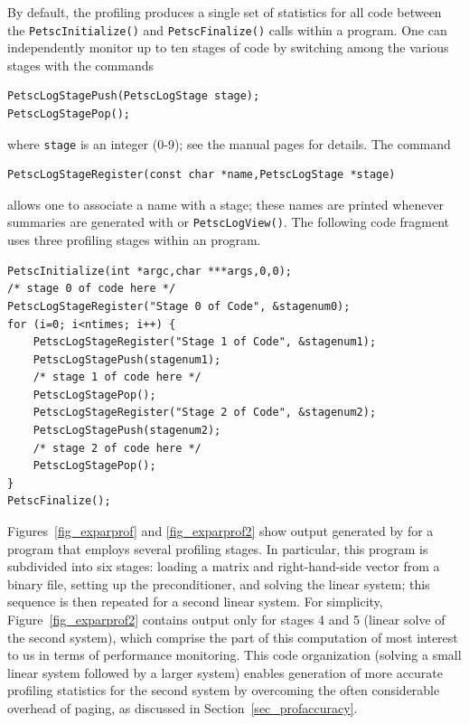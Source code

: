 {{By default, the profiling produces a single set of statistics for all
code between the \lstinline{PetscInitialize()} and \lstinline{PetscFinalize()}
calls within a program.  One can independently monitor up to ten
stages of code by switching among the various stages with the commands
\begin{lstlisting}
PetscLogStagePush(PetscLogStage stage);
PetscLogStagePop();
\end{lstlisting}
where \lstinline{stage} is an integer (0-9); see the manual pages for details.
The command
\begin{lstlisting}
PetscLogStageRegister(const char *name,PetscLogStage *stage)
\end{lstlisting}
allows one to associate a name with a stage; these names are printed whenever
summaries are generated with  or \lstinline{PetscLogView()}.
The following code fragment uses three profiling stages within an program.

\begin{lstlisting}
PetscInitialize(int *argc,char ***args,0,0);
/* stage 0 of code here */
PetscLogStageRegister("Stage 0 of Code", &stagenum0);
for (i=0; i<ntimes; i++) {
    PetscLogStageRegister("Stage 1 of Code", &stagenum1);
    PetscLogStagePush(stagenum1);
    /* stage 1 of code here */
    PetscLogStagePop();
    PetscLogStageRegister("Stage 2 of Code", &stagenum2);
    PetscLogStagePush(stagenum2);
    /* stage 2 of code here */
    PetscLogStagePop();
}
PetscFinalize();
\end{lstlisting}

Figures~\ref{fig_exparprof} and \ref{fig_exparprof2} show output
generated by  for a program that employs
several profiling stages.  In particular, this program is
subdivided into six stages: loading a matrix and right-hand-side
vector from a binary file, setting up the preconditioner, and solving
the linear system; this sequence is then repeated for a second linear
system.  For simplicity, Figure~\ref{fig_exparprof2} contains output
only for stages 4 and 5 (linear solve of the second system), which comprise
the part of this computation of most interest to us in terms of
performance monitoring.  This code organization (solving a small
linear system followed by a larger system) enables generation of more
accurate profiling statistics for the second system by overcoming the
often considerable overhead of paging, as discussed in
Section~\ref{sec_profaccuracy}.

}}
